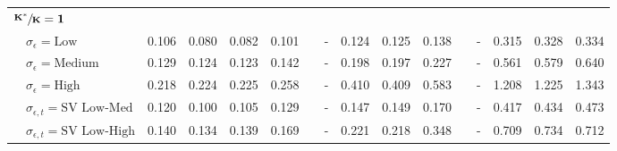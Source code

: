 \begin{table}[!tbp]
\begin{center}
\begin{tabular}{lllllcllllcllll}
\hline
{\bfseries $\mathbf{\sfrac{K^*}{K}=1}$}&&&&&&&&&&&&&&\tabularnewline
~~$\sigma_{\epsilon} =\text{Low}$& 0.106& 0.080& 0.082& 0.101&&-& 0.124& 0.125& 0.138&&-& 0.315& 0.328& 0.334\tabularnewline
~~$\sigma_{\epsilon} =\text{Medium}$& 0.129& 0.124& 0.123& 0.142&&-& 0.198& 0.197& 0.227&&-& 0.561& 0.579& 0.640\tabularnewline
~~$\sigma_{\epsilon} =\text{High}$& 0.218& 0.224& 0.225& 0.258&&-& 0.410& 0.409& 0.583&&-& 1.208& 1.225& 1.343\tabularnewline
~~$\sigma_{\epsilon,t} = \text{SV Low-Med}$& 0.120& 0.100& 0.105& 0.129&&-& 0.147& 0.149& 0.170&&-& 0.417& 0.434& 0.473\tabularnewline
~~$\sigma_{\epsilon,t}  = \text{SV Low-High}$& 0.140& 0.134& 0.139& 0.169&&-& 0.221& 0.218& 0.348&&-& 0.709& 0.734& 0.712\tabularnewline
\hline
\end{tabular}\end{center}
\end{table}

